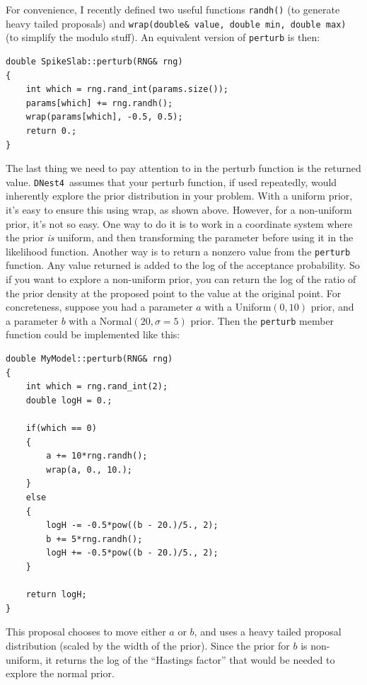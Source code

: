 \documentclass[a4paper, 11pt]{article}
\newcommand{\dnest}{{\tt DNest4}}
\begin{document}
For convenience, I recently defined two useful functions {\tt randh()}
(to generate heavy tailed proposals) and
{\tt wrap(double\& value, double min, double max)} (to simplify the modulo
stuff). An equivalent version of {\tt perturb} is then:\\

\begin{framed}
\begin{verbatim}
double SpikeSlab::perturb(RNG& rng)
{
    int which = rng.rand_int(params.size());
    params[which] += rng.randh();
    wrap(params[which], -0.5, 0.5);
    return 0.;
}
\end{verbatim}
\end{framed}

The last thing we need to pay attention to in the perturb function is the
returned value. \dnest~assumes that your perturb function, if used repeatedly,
would inherently explore the prior distribution in your problem. With
a uniform prior, it's easy to ensure this using wrap, as shown above.
However, for a non-uniform prior,
it's not so easy. One way to do it is to work in a coordinate system where
the prior {\it is} uniform, and then transforming the parameter before using
it in the likelihood function. Another way is to return a nonzero value from
the {\tt perturb} function. Any value returned is added to the log of the
acceptance probability. So if you want to explore a non-uniform prior, you
can return the log of the ratio of the prior density at the proposed point
to the value at the original point. For concreteness, suppose you had a
parameter $a$ with a Uniform$(0,10)$ prior, and a parameter $b$ with a
Normal$(20, \sigma=5)$ prior. Then the {\tt perturb} member function could be implemented
like this:\newpage

\begin{framed}
\begin{verbatim}
double MyModel::perturb(RNG& rng)
{
    int which = rng.rand_int(2);
    double logH = 0.;

    if(which == 0)
    {
        a += 10*rng.randh();
        wrap(a, 0., 10.);
    }
    else
    {
        logH -= -0.5*pow((b - 20.)/5., 2);
        b += 5*rng.randh();
        logH += -0.5*pow((b - 20.)/5., 2);
    }

    return logH;
}
\end{verbatim}
\end{framed}

This proposal chooses to move either $a$ or $b$, and uses a heavy tailed
proposal distribution (scaled by the width of the prior). Since the prior for
$b$ is non-uniform, it returns the log of the ``Hastings factor'' that would
be needed to explore the normal prior.\\
\end{document}
